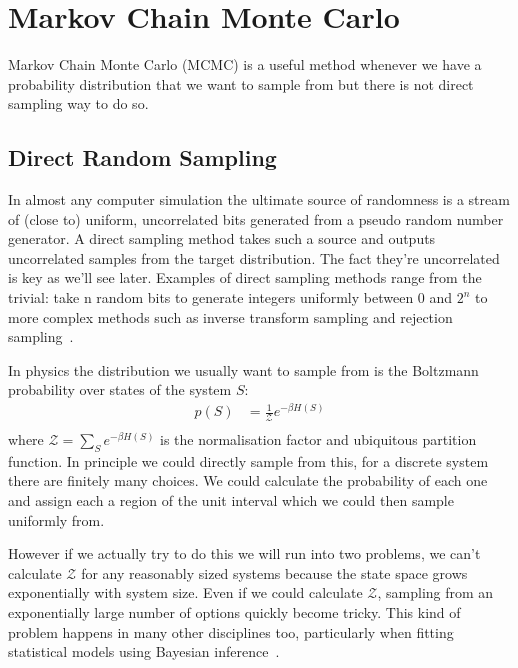 \hypertarget{markov-chain-monte-carlo}{%
\section{Markov Chain Monte Carlo}\label{markov-chain-monte-carlo}}

Markov Chain Monte Carlo (MCMC) is a useful method whenever we have a probability distribution that we want to sample from but there is not direct sampling way to do so.

\hypertarget{direct-random-sampling}{%
\subsection{Direct Random Sampling}\label{direct-random-sampling}}

In almost any computer simulation the ultimate source of randomness is a stream of (close to) uniform, uncorrelated bits generated from a pseudo random number generator. A direct sampling method takes such a source and outputs uncorrelated samples from the target distribution. The fact they're uncorrelated is key as we'll see later. Examples of direct sampling methods range from the trivial: take n random bits to generate integers uniformly between 0 and \(2^n\) to more complex methods such as inverse transform sampling and rejection sampling~\autocite{devroyeRandomSampling1986}.

In physics the distribution we usually want to sample from is the Boltzmann probability over states of the system \(S\): \[
\begin{aligned}
p(S)  &= \frac{1}{\mathcal{Z}} e^{-\beta H(S)} \\
\end{aligned}
\] where \(\mathcal{Z} = \sum_S e^{-\beta H(S)}\) is the normalisation factor and ubiquitous partition function. In principle we could directly sample from this, for a discrete system there are finitely many choices. We could calculate the probability of each one and assign each a region of the unit interval which we could then sample uniformly from.

However if we actually try to do this we will run into two problems, we can't calculate \(\mathcal{Z}\) for any reasonably sized systems because the state space grows exponentially with system size. Even if we could calculate \(\mathcal{Z}\), sampling from an exponentially large number of options quickly become tricky. This kind of problem happens in many other disciplines too, particularly when fitting statistical models using Bayesian inference~\autocite{BMCP2021}.

